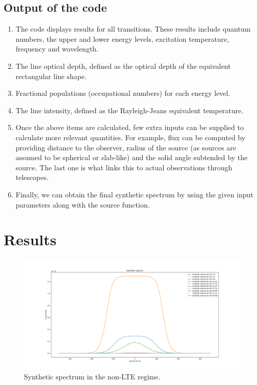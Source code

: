 \documentclass{article}
\begin{document}
\subsection{Output of the code}
\begin{enumerate}
    \item The code displays results for all transitions. These results include
    quantum numbers, the upper and lower energy levels, excitation temperature,
    frequency and wavelength.
    \item The line optical depth, defined as the optical depth of the equivalent rectangular line shape.
    \item Fractional populations (occupational numbers) for each energy level.
    \item The line intensity, defined as the Rayleigh-Jeans equivalent temperature.
    \item Once the above items are calculated, few extra inputs can be supplied to calculate
    more relevant quantities. For example, flux can be computed by providing distance to the
    observer, radius of the source (as sources are assumed to be spherical or slab-like)
    and the solid angle subtended by the source. The last one is what links this to actual
    observations through telescopes.
    \item Finally, we can obtain the final synthetic spectrum by using the given input
    parameters along with the source function.
\end{enumerate}
\section{Results}
\begin{figure}
	\centering
	\includegraphics[scale=0.25]{Figure_1.png}
	\caption{Synthetic spectrum in the non-LTE regime.}
\end{figure}

\nocite*{}


\end{document}
